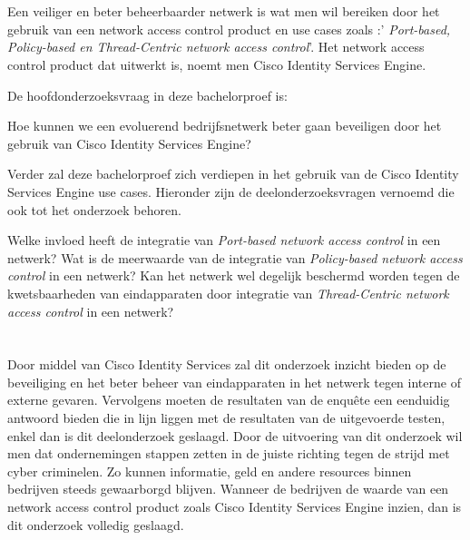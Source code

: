 \section{}
\label{sec:onderzoeksvraag}
Een veiliger en beter beheerbaarder netwerk is wat men wil bereiken door het gebruik van een network access control product en use cases zoals :'\textit{
Port-based, Policy-based en Thread-Centric network access control}'. Het network access control product dat uitwerkt is, noemt men Cisco Identity Services Engine.

De hoofdonderzoeksvraag in deze bachelorproef is: 
\begin{displayquote}
	Hoe kunnen we een evoluerend bedrijfsnetwerk beter gaan beveiligen door het gebruik van Cisco Identity Services Engine?
\newline
\newline
\end{displayquote}
Verder zal deze bachelorproef zich verdiepen in het gebruik van de Cisco Identity Services Engine use cases. Hieronder zijn de deelonderzoeksvragen vernoemd die ook tot het onderzoek behoren.
\begin{displayquote}
	Welke invloed heeft de integratie van \textit{Port-based network access control} in een netwerk?  
\newline
\newline
	Wat is de meerwaarde van de integratie van \textit{Policy-based network access control} in een netwerk?  
\newline
\newline
	Kan het netwerk wel degelijk beschermd worden tegen de 
	kwetsbaarheden van eindapparaten door integratie van \textit{Thread-Centric network access control} in een netwerk?  
\end{displayquote}

\section{}
\label{sec:onderzoeksdoelstelling}

Door middel van Cisco Identity Services zal dit onderzoek inzicht bieden op de beveiliging en het beter beheer van eindapparaten in het netwerk tegen interne of externe gevaren. Vervolgens moeten de resultaten van de enquête een eenduidig antwoord bieden die in lijn liggen met de resultaten van de uitgevoerde testen, enkel dan is dit deelonderzoek geslaagd. Door de uitvoering van dit onderzoek wil men dat ondernemingen stappen zetten in de juiste richting tegen de strijd met cyber criminelen. Zo kunnen informatie, geld en andere resources binnen bedrijven steeds gewaarborgd blijven. Wanneer de bedrijven de waarde van een network access control product zoals Cisco Identity Services Engine inzien, dan is dit onderzoek volledig geslaagd.


